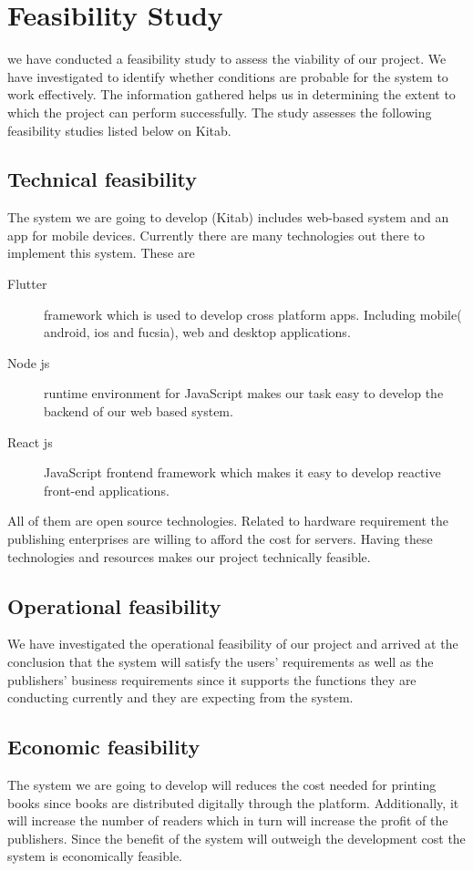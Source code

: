 \section{Feasibility Study}
we have conducted a feasibility study to assess the viability of our project. We have investigated to identify whether conditions are probable for the system to work effectively. The information gathered helps us in determining the extent to which the project can perform successfully.
\bigskip
The study assesses the following feasibility studies listed below on Kitab.

	\subsection{Technical feasibility}
The system we are going to develop (Kitab) includes web-based system and an app for mobile devices. Currently there are many technologies out there to implement this system.
These are

	\begin{description}
	\item[Flutter] framework which is used to develop cross platform apps. Including mobile( android, ios and fucsia), web and desktop applications.
	\item[Node js] runtime environment  for JavaScript makes our task easy to develop the backend of our web based system.
	\item[React js] JavaScript frontend framework which makes it easy to develop reactive front-end applications.
	\end{description}

All of them are open source technologies. Related to hardware requirement the publishing enterprises are willing to afford the cost for servers. Having these technologies and resources makes our project technically feasible.

	\subsection{Operational feasibility}
We have investigated the operational feasibility of our project and arrived at the conclusion that the system will satisfy the users’ requirements as well as the publishers’ business requirements since it supports the functions they are conducting currently and they are expecting from the system.

	\subsection{Economic feasibility}
The system we are going to develop will reduces the cost needed for printing books since books are distributed digitally through the platform. Additionally, it will increase the number of readers which in turn will increase the profit of the publishers. Since the benefit of the system will outweigh the development cost the system is economically feasible.


